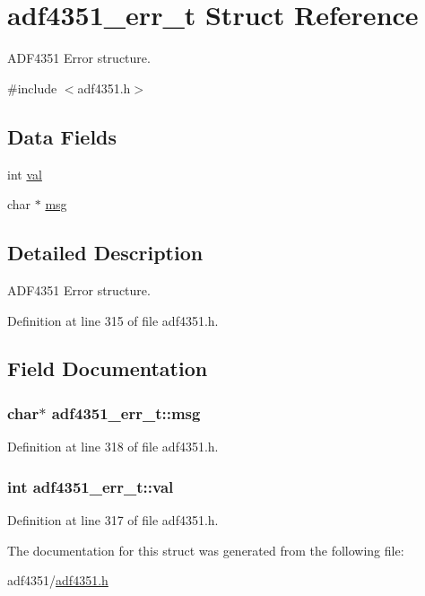 \hypertarget{structadf4351__err__t}{}\section{adf4351\+\_\+err\+\_\+t Struct Reference}
\label{structadf4351__err__t}


A\+D\+F4351 Error structure.  




{\ttfamily \#include $<$adf4351.\+h$>$}

\subsection*{Data Fields}
\begin{DoxyCompactItemize}
\item 
int \hyperlink{structadf4351__err__t_ab5be0db827951d8d9f360b7b31238d7c}{val}
\item 
char $\ast$ \hyperlink{structadf4351__err__t_abbb87d190201d79e2ca442403d12bd3d}{msg}
\end{DoxyCompactItemize}


\subsection{Detailed Description}
A\+D\+F4351 Error structure. 

Definition at line 315 of file adf4351.\+h.



\subsection{Field Documentation}
\subsubsection[{\texorpdfstring{msg}{msg}}]{\setlength{\rightskip}{0pt plus 5cm}char$\ast$ adf4351\+\_\+err\+\_\+t\+::msg}\hypertarget{structadf4351__err__t_abbb87d190201d79e2ca442403d12bd3d}{}\label{structadf4351__err__t_abbb87d190201d79e2ca442403d12bd3d}


Definition at line 318 of file adf4351.\+h.

\subsubsection[{\texorpdfstring{val}{val}}]{\setlength{\rightskip}{0pt plus 5cm}int adf4351\+\_\+err\+\_\+t\+::val}\hypertarget{structadf4351__err__t_ab5be0db827951d8d9f360b7b31238d7c}{}\label{structadf4351__err__t_ab5be0db827951d8d9f360b7b31238d7c}


Definition at line 317 of file adf4351.\+h.



The documentation for this struct was generated from the following file\+:\begin{DoxyCompactItemize}
\item 
adf4351/\hyperlink{adf4351_8h}{adf4351.\+h}\end{DoxyCompactItemize}
